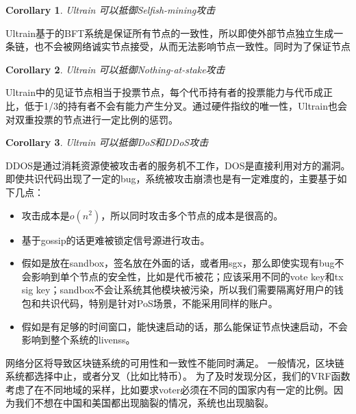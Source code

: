 \documentclass[12pt, UTF8]{article}
\newtheorem{corollary}{Corollary}[theorem]
\begin{document}
\begin{corollary}
Ultrain 可以抵御Selfish-mining攻击
\end{corollary}
Ultrain基于的BFT系统是保证所有节点的一致性，所以即使外部节点独立生成一条链，也不会被网络诚实节点接受，从而无法影响节点一致性。同时为了保证节点

\begin{corollary}
Ultrain 可以抵御Nothing-at-stake攻击
\end{corollary}
Ultrain中的见证节点相当于投票节点，每个代币持有者的投票能力与代币成正比，低于1/3的持有者不会有能力产生分叉。通过硬件指纹的唯一性，Ultrain也会对双重投票的节点进行一定比例的惩罚。

\begin{corollary}
Ultrain 可以抵御DoS和DDoS攻击
\end{corollary}
DDOS是通过消耗资源使被攻击者的服务机不工作，DOS是直接利用对方的漏洞。
即使共识代码出现了一定的bug，系统被攻击崩溃也是有一定难度的，主要基于如下几点：
\begin{itemize}
\item 攻击成本是$o(n^2)$，所以同时攻击多个节点的成本是很高的。
\item 基于gossip的话更难被锁定信号源进行攻击。
\item 假如是放在sandbox，签名放在外面的话，或者用sgx，那么即使实现有bug不会影响到单个节点的安全性，比如是代币被花；应该采用不同的vote key和tx sig key；sandbox不会让系统其他模块被污染，所以我们需要隔离好用户的钱包和共识代码，特别是针对PoS场景，不能采用同样的账户。
\item 假如是有足够的时间窗口，能快速启动的话，那么能保证节点快速启动，不会影响到整个系统的livenss。
\end{itemize}

网络分区将导致区块链系统的可用性和一致性不能同时满足。
一般情况，区块链系统都选择中止，或者分叉（比如比特币）。
为了及时发现分区，我们的VRF函数考虑了在不同地域的采样，比如要求voter必须在不同的国家内有一定的比例。因为我们不想在中国和美国都出现脑裂的情况，系统也出现脑裂。

\medskip


\end{document}

